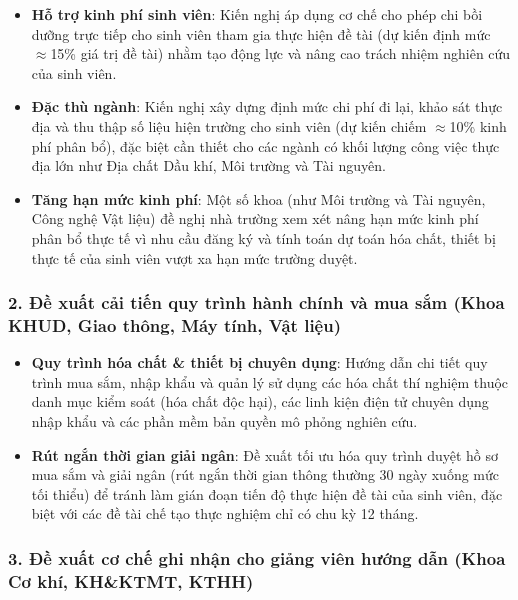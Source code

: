 \documentclass[11pt,a4paper]{article}
\providecommand{\tightlist}{%
  \setlength{\itemsep}{0pt}\setlength{\parskip}{0pt}}
\begin{document}
\begin{itemize}
\tightlist
\item
  \textbf{Hỗ trợ kinh phí sinh viên}: Kiến nghị áp dụng cơ chế cho phép
  chi bồi dưỡng trực tiếp cho sinh viên tham gia thực hiện đề tài (dự
  kiến định mức \(\approx\)15\% giá trị đề tài) nhằm tạo động lực và nâng cao
  trách nhiệm nghiên cứu của sinh viên.
\item
  \textbf{Đặc thù ngành}: Kiến nghị xây dựng định mức chi phí đi lại,
  khảo sát thực địa và thu thập số liệu hiện trường cho sinh viên (dự
  kiến chiếm \(\approx\)10\% kinh phí phân bổ), đặc biệt cần thiết cho các ngành
  có khối lượng công việc thực địa lớn như Địa chất Dầu khí, Môi trường
  và Tài nguyên.
\item
  \textbf{Tăng hạn mức kinh phí}: Một số khoa (như Môi trường và Tài
  nguyên, Công nghệ Vật liệu) đề nghị nhà trường xem xét nâng hạn mức
  kinh phí phân bổ thực tế vì nhu cầu đăng ký và tính toán dự toán hóa
  chất, thiết bị thực tế của sinh viên vượt xa hạn mức trường duyệt.
\end{itemize}

\subsubsection{2. Đề xuất cải tiến quy trình hành chính và mua sắm (Khoa
KHUD, Giao thông, Máy tính, Vật
liệu)}\label{ux111ux1ec1-xuux1ea5t-cux1ea3i-tiux1ebfn-quy-truxecnh-huxe0nh-chuxednh-vuxe0-mua-sux1eafm-khoa-khud-giao-thuxf4ng-muxe1y-tuxednh-vux1eadt-liux1ec7u}

\begin{itemize}
\tightlist
\item
  \textbf{Quy trình hóa chất \& thiết bị chuyên dụng}: Hướng dẫn chi
  tiết quy trình mua sắm, nhập khẩu và quản lý sử dụng các hóa chất thí
  nghiệm thuộc danh mục kiểm soát (hóa chất độc hại), các linh kiện điện
  tử chuyên dụng nhập khẩu và các phần mềm bản quyền mô phỏng nghiên
  cứu.
\item
  \textbf{Rút ngắn thời gian giải ngân}: Đề xuất tối ưu hóa quy trình
  duyệt hồ sơ mua sắm và giải ngân (rút ngắn thời gian thông thường 30
  ngày xuống mức tối thiểu) để tránh làm gián đoạn tiến độ thực hiện đề
  tài của sinh viên, đặc biệt với các đề tài chế tạo thực nghiệm chỉ có
  chu kỳ 12 tháng.
\end{itemize}

\subsubsection{3. Đề xuất cơ chế ghi nhận cho giảng viên hướng dẫn (Khoa
Cơ khí, KH\&KTMT,
KTHH)}\label{ux111ux1ec1-xuux1ea5t-cux1a1-chux1ebf-ghi-nhux1eadn-cho-giux1ea3ng-viuxean-hux1b0ux1edbng-dux1eabn-khoa-cux1a1-khuxed-khktmt-kthh}
\end{document}
